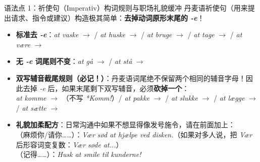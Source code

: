 \begin{grammatikbox}{语法点 1：祈使句（Imperativ）构词规则与职场礼貌缓冲}
丹麦语祈使句（用来提出请求、指令或建议）构造极其简单：\textbf{去掉动词原形末尾的 \textit{-e}}！
\begin{itemize}
  \item \textbf{标准去 \textit{-e}}：\textit{at vaske} $\rightarrow$  / \textit{at huske} $\rightarrow$  / \textit{at bruge} $\rightarrow$  / \textit{at tage} $\rightarrow$  / \textit{at være} $\rightarrow$ 
  \item \textbf{无 \textit{-e} 词尾则不变}：\textit{at gå} $\rightarrow$  / \textit{at stå} $\rightarrow$ 
  \item \textbf{双写辅音截尾规则（必记！）}：丹麦语词尾绝不保留两个相同的辅音字母！因此去掉 \textit{-e} 后，如果末尾剩下双写辅音，必须\textbf{砍掉一个}：\\
    \textit{at komme} $\rightarrow$ （不写 \textit{*Komm!}）/ \textit{at pakke} $\rightarrow$  / \textit{at slukke} $\rightarrow$  / \textit{at lægge} $\rightarrow$  / \textit{at sætte} $\rightarrow$ 
  \item \textbf{礼貌加柔配方}：日常沟通中如果不想显得像发号施令，请在前面加上：\\
    （麻烦你/请你……）：\textit{Vær sød at hjælpe ved disken.}（如果对多人说，把 \textit{Vær} 后形容词变复数：\textit{Vær søde at...}）\\
    （记得……）：\textit{Husk at smile til kunderne!}
\end{itemize}
\end{grammatikbox}

